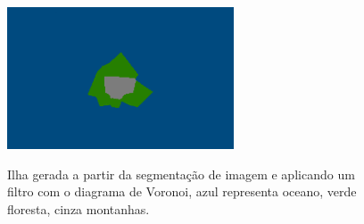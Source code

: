 \begin{figure}[!ht]
	\centering
    \caption{Ilha gerada a partir da segmentação de imagem e aplicando um filtro com o diagrama de Voronoi, azul representa oceano, verde floresta, cinza montanhas.}
	\includegraphics[width=0.6\textwidth]{figures/segmantations_pnl.png}
	\label{fig:segmantations_pnl}
\end{figure}

